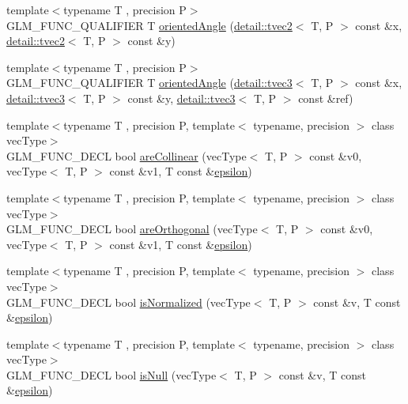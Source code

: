\begin{DoxyCompactItemize}
\item 
{\footnotesize template$<$typename T , precision P$>$ }\\G\+L\+M\+\_\+\+F\+U\+N\+C\+\_\+\+Q\+U\+A\+L\+I\+F\+I\+ER T \hyperlink{group__gtx__vector__angle_ga6f9cbae1b02b49ad92a1d0070649f038}{oriented\+Angle} (\hyperlink{structglm_1_1detail_1_1tvec2}{detail\+::tvec2}$<$ T, P $>$ const \&x, \hyperlink{structglm_1_1detail_1_1tvec2}{detail\+::tvec2}$<$ T, P $>$ const \&y)
\item 
{\footnotesize template$<$typename T , precision P$>$ }\\G\+L\+M\+\_\+\+F\+U\+N\+C\+\_\+\+Q\+U\+A\+L\+I\+F\+I\+ER T \hyperlink{group__gtx__vector__angle_ga2aefc221dd5ed9fdacc17c28eea76775}{oriented\+Angle} (\hyperlink{structglm_1_1detail_1_1tvec3}{detail\+::tvec3}$<$ T, P $>$ const \&x, \hyperlink{structglm_1_1detail_1_1tvec3}{detail\+::tvec3}$<$ T, P $>$ const \&y, \hyperlink{structglm_1_1detail_1_1tvec3}{detail\+::tvec3}$<$ T, P $>$ const \&ref)
\item 
{\footnotesize template$<$typename T , precision P, template$<$ typename, precision $>$ class vec\+Type$>$ }\\G\+L\+M\+\_\+\+F\+U\+N\+C\+\_\+\+D\+E\+CL bool \hyperlink{group__gtx__vector__query_ga465b844190d1740051e45d780832ea4c}{are\+Collinear} (vec\+Type$<$ T, P $>$ const \&v0, vec\+Type$<$ T, P $>$ const \&v1, T const \&\hyperlink{group__gtc__constants_gacb41049b8d22c8aa90e362b96c524feb}{epsilon})
\item 
{\footnotesize template$<$typename T , precision P, template$<$ typename, precision $>$ class vec\+Type$>$ }\\G\+L\+M\+\_\+\+F\+U\+N\+C\+\_\+\+D\+E\+CL bool \hyperlink{group__gtx__vector__query_gaee10acefed397c11e01f2862e837754c}{are\+Orthogonal} (vec\+Type$<$ T, P $>$ const \&v0, vec\+Type$<$ T, P $>$ const \&v1, T const \&\hyperlink{group__gtc__constants_gacb41049b8d22c8aa90e362b96c524feb}{epsilon})
\item 
{\footnotesize template$<$typename T , precision P, template$<$ typename, precision $>$ class vec\+Type$>$ }\\G\+L\+M\+\_\+\+F\+U\+N\+C\+\_\+\+D\+E\+CL bool \hyperlink{group__gtx__vector__query_ga6fa5fa2af67d14c205d24c49aad03270}{is\+Normalized} (vec\+Type$<$ T, P $>$ const \&v, T const \&\hyperlink{group__gtc__constants_gacb41049b8d22c8aa90e362b96c524feb}{epsilon})
\item 
{\footnotesize template$<$typename T , precision P, template$<$ typename, precision $>$ class vec\+Type$>$ }\\G\+L\+M\+\_\+\+F\+U\+N\+C\+\_\+\+D\+E\+CL bool \hyperlink{group__gtx__vector__query_ga81a64edc1a2b470b82896592e89c523b}{is\+Null} (vec\+Type$<$ T, P $>$ const \&v, T const \&\hyperlink{group__gtc__constants_gacb41049b8d22c8aa90e362b96c524feb}{epsilon})

\end{DoxyCompactItemize}
